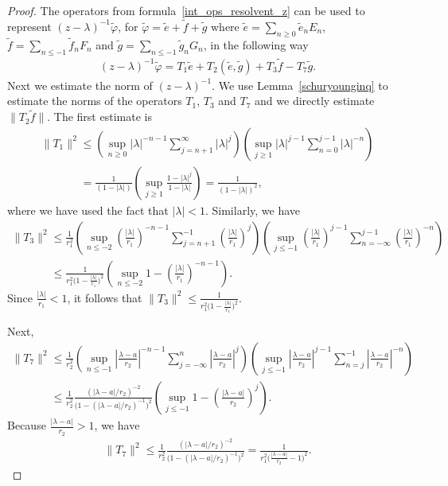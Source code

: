 \documentclass[pdftex]{sigma}
\numberwithin{equation}{section}
\begin{document}
\begin{proof}
The operators from formula~\eqref{int_ops_resolvent_z} can be used to represent $(z-\lambda)^{-1}\tilde{\varphi}$, for
$\tilde{\varphi}=\tilde{e}+\tilde{f}+\tilde{g}$ where $\tilde{e}=\sum\limits_{n\ge0}\tilde{e}_nE_n$,
$\tilde{f}=\sum\limits_{n\le -1}\tilde{f}_nF_n$ and $\tilde{g}=\sum\limits_{n\le -1}\tilde{g}_nG_n$, in the following way
\begin{gather*}
(z-\lambda)^{-1}\tilde{\varphi}=T_1\tilde{e}+T_2(\tilde{e},\tilde{g})+T_3\tilde{f}-T_7\tilde{g}.
\end{gather*}
Next we estimate the norm of $(z-\lambda)^{-1}$.
We use Lemma~\ref{schuryounginq} to estimate the norms of the operators $T_1$, $T_3$ and $T_7$ and we directly estimate
$\|T_2\tilde{f}\|$.
The f\/irst estimate is
\begin{gather*}
\|T_1\|^2
\leq \left(\sup_{n \geq 0} |\lambda|^{-n-1} \sum\limits_{j=n+1}^{\infty}|\lambda|^j \right)\left(\sup_{j \geq 1} |\lambda|^{j-1}
\sum\limits_{n=0}^{j-1}|\lambda|^{-n} \right)
\\
\phantom{\|T_1\|^2}{}
=\frac 1{\left(1-|\lambda|\right)}\left(\sup_{j \geq 1} \frac{1-|\lambda|^j}{1-|\lambda|} \right)=\frac1{\left(1-|\lambda|\right)^2},
\end{gather*}
where we have used the fact that $|\lambda|<1$.
Similarly, we have
\begin{gather*}
\|T_3\|^2
\leq \frac 1{r_1^2}\left(\sup_{n \leq -2} \left(\frac{|\lambda|}{r_1}\right)^{-n-1}
\sum\limits_{j=n+1}^{-1}\left(\frac{|\lambda|}{r_1}\right)^j \right) \left(\sup_{j \leq -1}
\left(\frac{|\lambda|}{r_1}\right)^{j-1} \sum\limits_{n=-\infty}^{j-1}\left(\frac{|\lambda|}{r_1}\right)^{-n} \right)
\\
\phantom{\|T_3\|^2}{}
  \leq \frac 1{r_1^2 \big(1- \frac{|\lambda|}{r_1}\big)^2} \left(\sup_{n\leq -2}
1-\left(\frac{|\lambda|}{r_1}\right)^{-n-1}\right).
\end{gather*}
Since $\frac{|\lambda|}{r_1} <1$, it follows that $\|T_3\|^2 \leq \frac{1}{r_1^2\big(1- \frac{|\lambda|}{r_1}\big)^2}$.

Next,
\begin{gather*}
\|T_7\|^2  \leq \frac 1{r_2^2} \left(\sup_{n \leq -1} \left|\frac{\lambda -a}{r_2} \right|^{-n-1}
\sum\limits_{j=-\infty}^n \left|\frac{\lambda -a}{r_2} \right|^j \right) \left(\sup_{j \leq -1} \left|\frac{\lambda
-a}{r_2} \right|^{j-1} \sum\limits_{n=j}^{-1} \left|\frac{\lambda -a}{r_2} \right|^{-n} \right)
\\
\phantom{\|T_7\|^2}{}
  \leq \frac 1{r_2^2} \frac{(|\lambda -a|/ r_2)^{-2}}{\big(1- (|\lambda -a|/ r_2)^{-1}\big)^2} \left(\sup_{j \leq -1} 1-
\left(\frac{|\lambda -a|}{r_2}\right)^j\right).
\end{gather*}
Because $\frac{|\lambda -a|}{r_2}>1$, we have
\begin{gather*}
\|T_7\|^2 \leq \frac 1{r_2^2} \frac{(|\lambda -a|/ r_2)^{-2}}{\big(1- (|\lambda -a|/ r_2)^{-1}\big)^2}=\frac {1}{r_1^2
\big(\frac{|\lambda -a|}{r_2} -1\big)^2}.
\end{gather*}


\end{proof}
\end{document}
